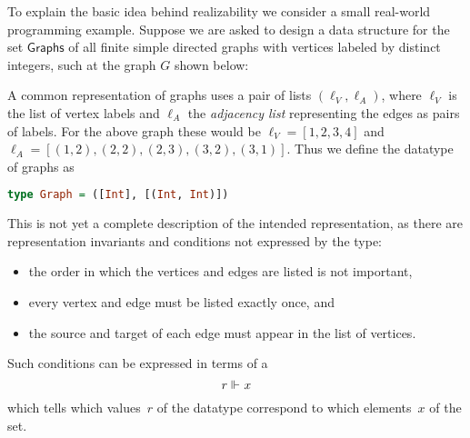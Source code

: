 To explain the basic idea behind realizability we consider a small real-world programming example. Suppose we are asked to design a data structure for the set $\mathsf{Graphs}$ of all finite simple directed graphs with vertices labeled by distinct integers, such at the graph $G$ shown below:
%
\begin{center}
\end{center}
%
A common representation of graphs uses a pair of lists $(\ell_V, \ell_A)$, where $\ell_V$ is the list of vertex labels and $\ell_A$ the \emph{adjacency list} representing the edges as pairs of labels. For the above graph these would be $\ell_V = [1, 2, 3, 4]$ and $\ell_A = [(1,2), (2,2), (2,3), (3,2), (3,1)]$.
%
Thus we define the datatype of graphs as
%
\begin{lstlisting}[language=Haskell]
type Graph = ([Int], [(Int, Int)])
\end{lstlisting}
%
This is not yet a complete description of the intended representation, as there are representation invariants and conditions not expressed by the type:
%
\begin{itemize}
\item the order in which the vertices and edges are listed is not
  important,
\item every vertex and edge must be listed exactly once, and
\item the source and target of each edge must appear in the list of vertices.
\end{itemize}
%
Such conditions can be expressed in terms of a 
\begin{equation*}
  r \Vdash_{} x
\end{equation*}
%
which tells which values~$r$ of the datatype correspond to which elements~$x$ of the set.
